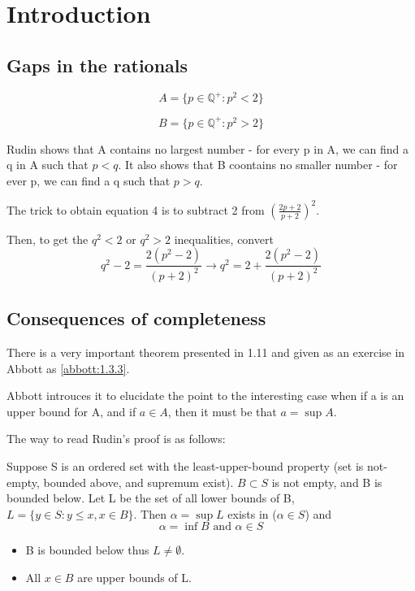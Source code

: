 \section{Introduction}

\subsection{Gaps in the rationals}

$$
A = \{p\in\mathbb{Q^+}: p^2 < 2 \}
$$

$$
B = \{p\in\mathbb{Q^+}: p^2 > 2 \}
$$

Rudin shows that A contains no largest number -
for every p in A, we can find a q in A such that $p < q$.
It also shows that B coontains no smaller number -
for ever p, we can find a q such that $p > q$.

The trick to obtain equation 4 is to subtract 2 from $\left(\frac{2p+2}{p+2}\right)^2$.

Then, to get the $q^2 < 2$ or $q^2 > 2$ inequalities, convert
$$
q^2 - 2 = \frac{2(p^2 -2)}{(p+2)^2} \rightarrow q^2 = 2 + \frac{2(p^2 -2)}{(p+2)^2}
$$


\subsection{Consequences of completeness}

There is a very important theorem presented in 1.11 and given as an exercise in Abbott as
\ref{abbott:1.3.3}.

Abbott introuces it to elucidate the point to the interesting case when 
if a is an upper bound for A, and if $a\in A$, then it must be that $a = \sup A$.

The way to read Rudin's proof is as follows:

Suppose S is an ordered set with the least-upper-bound property (set is not-empty, bounded above, and supremum exist).
$B \subset S$ is not empty, and B is bounded below.
Let L be the set of all lower bounds of B, $L = \{ y\in S : y \leq x , x\in B \}$.
Then $\alpha = \sup L $ exists in ($\alpha \in S$) and
$$
\alpha = \inf B \text{ and } \alpha \in S
$$

\begin{itemize}
    \item B is bounded below thus $L \neq \emptyset$.
    \item All $x\in B$ are upper bounds of L.
\end{itemize}

